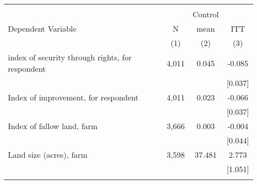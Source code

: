 \begin{tabular}{lccc}
\hline \noalign{\smallskip} &  &  & \\
 &  & Control & \\
Dependent Variable & N & mean & ITT\\
 & (1) & (2) & (3)\\
\noalign{\smallskip}\hline \noalign{\smallskip}index of security through rights, for respondent & 4,011 & 0.045 & -0.085\\
 &  &  & [0.037]\\
Index of improvement, for respondent & 4,011 & 0.023 & -0.066\\
 &  &  & [0.037]\\
Index of fallow land, farm & 3,666 & 0.003 & -0.004\\
 &  &  & [0.044]\\
Land size (acres), farm & 3,598 & 37.481 & 2.773\\
 &  &  & [1.051]\\
\noalign{\smallskip}\hline\end{tabular}
